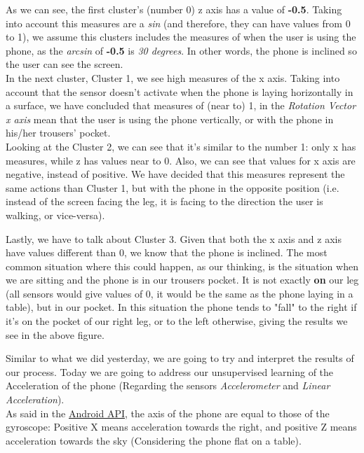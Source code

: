 \documentclass[idxtotoc,hyperref,openany]{labbook} %
\begin{document}
As we can see, the first cluster's (number 0) z axis has a value of \textbf{-0.5}. Taking into account this measures are a \textit{sin} (and therefore, they can have values from 0 to 1), we assume this clusters includes the measures of when the user is using the phone, as the \textit{arcsin} of \textbf{-0.5} is \textit{30 degrees}. In other words, the phone is inclined so the user can see the screen.\\

In the next cluster, Cluster 1, we see high measures of the x axis. Taking into account that the sensor doesn't activate when the phone is laying horizontally in a surface, we have concluded that measures of (near to) 1, in the \textit{Rotation Vector x axis} mean that the user is using the phone vertically, or with the phone in his/her trousers' pocket.\\

Looking at the Cluster 2, we can see that it's similar to the number 1: only x has measures, while z has values near to 0. Also, we can see that values for x axis are negative, instead of positive. We have decided that this measures represent the same actions than Cluster 1, but with the phone in the opposite position (i.e. instead of the screen facing the leg, it is facing to the direction the user is walking, or vice-versa).

\clearpage
Lastly, we have to talk about Cluster 3. Given that both the x axis and z axis have values different than 0, we know that the phone is inclined. The most common situation where this could happen, as our thinking, is the situation when we are sitting and the phone is in our trousers pocket. It is not exactly \textbf{on} our leg (all sensors would give values of 0, it would be the same as the phone laying in a table), but in our pocket. In this situation the phone tends to "fall" to the right if it's on the pocket of our right leg, or to the left otherwise, giving the results we see in the above figure.



Similar to what we did yesterday, we are going to try and interpret the results of our process. Today we are going to address our unsupervised learning of the Acceleration of the phone (Regarding the sensors \textit{Accelerometer} and \textit{Linear Acceleration}). \\
As said in the \href{https://developer.android.com/guide/topics/sensors/sensors_motion}{Android API}, the axis of the phone are equal to those of the gyroscope: Positive X means acceleration towards the right, and positive Z means acceleration towards the sky (Considering the phone flat on a table).\\
\end{document}
